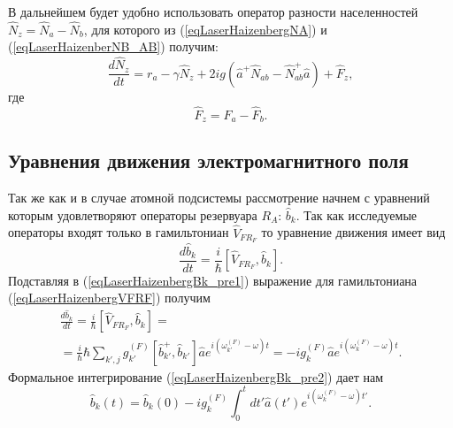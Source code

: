 В дальнейшем будет удобно использовать оператор разности населенностей
$\hat{N}_z = \hat{N}_a - \hat{N}_b$, для которого из
(\ref{eqLaserHaizenbergNA}) и 
(\ref{eqLaserHaizenberNB_AB}) получим:
\begin{equation}
\frac{d \hat{N}_z}{d t} = r_a
- \gamma \hat{N}_{z} +
2 i g 
 \left(
\hat{a}^{+}\hat{N}_{ab} -
\hat{N}_{ab}^{+}\hat{a}
\right) + \hat{F}_{z},
\label{eqLaserHaizenberNZ}
\end{equation}
где
\begin{equation}
\hat{F}_{z} = \hat{F}_{a} - \hat{F}_{b}.
\label{eqLaserHaizenberFZ}
\end{equation}

\subsection{Уравнения движения электромагнитного поля}

Так же как и в случае атомной подсистемы рассмотрение начнем с
уравнений которым удовлетворяют операторы резервуара $R_A$:
$\hat{b}_k$. Так как исследуемые операторы входят только в
гамильтониан $\hat{V}_{FR_F}$ то уравнение движения имеет вид
\begin{equation}
\frac{d \hat{b}_k}{d t} = \frac{i}{\hbar}\left[\hat{V}_{FR_F}, \hat{b}_k
\right].
\label{eqLaserHaizenbergBk_pre1}
\end{equation}
Подставляя в (\ref{eqLaserHaizenbergBk_pre1}) выражение для
гамильтониана (\ref{eqLaserHaizenbergVFRF}) получим
\begin{eqnarray}
\frac{d \hat{b}_k}{d t} = \frac{i}{\hbar}\left[\hat{V}_{FR_F}, \hat{b}_k
\right] = 
\nonumber \\
= \frac{i}{\hbar} \hbar 
\sum_{k',j} 
g_{k'}^{(F)}\left[\hat{b}_{k'}^{+},
  \hat{b}_{k'}\right]\hat{a}e^{i\left(\omega_{k'}^{(F)} - \omega\right)t} = 
-i g_{k}^{(F)}\hat{a}e^{i\left(\omega_{k}^{(F)} - \omega\right)t}.
\label{eqLaserHaizenbergBk_pre2}
\end{eqnarray}
Формальное интегрирование (\ref{eqLaserHaizenbergBk_pre2}) дает нам
\begin{equation}
\hat{b}_k\left(t\right) = 
\hat{b}_k\left(0\right) 
-i g_{k}^{(F)}\int_0^t d
t'\hat{a}\left(t'\right)e^{i\left(\omega_{k}^{(F)} - \omega\right)t'}.
\label{eqLaserHaizenbergBk}
\end{equation}

